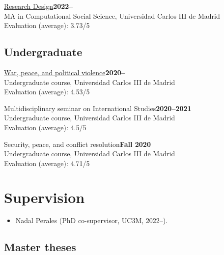 \documentclass[a4paper, 12pt]{article}
\begin{document}
\noindent
\href{https://github.com/franvillamil/syllabi/blob/master/current/syllabus_research_design.pdf}{Research Design}\hfill\textbf{2022--}\\
{\small MA in Computational Social Science, Universidad Carlos III de Madrid}\\
{\small Evaluation (average): 3.73/5} %

\subsection*{Undergraduate}

\noindent
\href{https://github.com/franvillamil/syllabi/blob/master/current/syllabus_war_peace_political_violence.pdf}{War, peace, and political violence}\hfill\textbf{2020--}\\
{\small Undergraduate course, Universidad Carlos III de Madrid}\\
{\small Evaluation (average): 4.53/5} %
\vspace{10pt}

\noindent
Multidisciplinary seminar on International Studies\hfill\textbf{2020--2021}\\
{\small Undergraduate course, Universidad Carlos III de Madrid}\\
{\small Evaluation (average): 4.5/5} %
\vspace{10pt}

\noindent
Security, peace, and conflict resolution\hfill\textbf{Fall 2020}\\
{\small Undergraduate course, Universidad Carlos III de Madrid}\\
{\small Evaluation (average): 4.71/5} %

\section*{Supervision}

\begin{itemize}[leftmargin=*, nolistsep]
	\item Nadal Perales (PhD co-supervisor, UC3M, 2022--).
\end{itemize}

\subsection*{Master theses}
\end{document}
